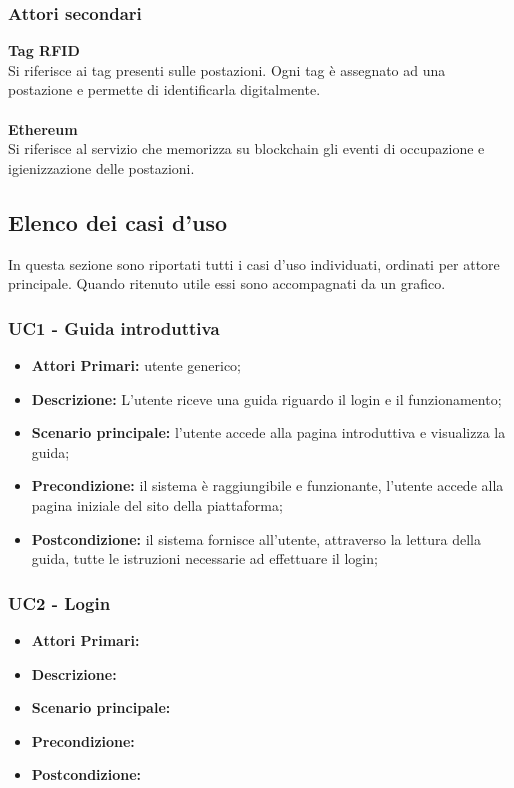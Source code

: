\subsubsection{Attori secondari}
\textbf{Tag RFID}\\
Si riferisce ai tag presenti sulle postazioni. Ogni tag è assegnato ad una postazione e permette di identificarla digitalmente.\\
\\
\textbf{Ethereum}\\
Si riferisce al servizio che memorizza su blockchain gli eventi di occupazione e igienizzazione delle postazioni.\\

\subsection{Elenco dei casi d'uso}
In questa sezione sono riportati tutti i casi d'uso individuati, ordinati per attore principale. Quando ritenuto utile essi sono accompagnati da un grafico.
\\
\subsubsection{ UC1 - Guida introduttiva}
\begin{itemize}
           	\item\textbf{Attori Primari:} utente generico;
           	\item\textbf{Descrizione:} L'utente riceve una guida riguardo il login e il funzionamento;
           	\item\textbf{Scenario principale:} l’utente accede alla pagina introduttiva e visualizza la guida;
           	\item\textbf{Precondizione:} il sistema è raggiungibile e funzionante, l’utente accede alla pagina iniziale del sito della piattaforma;
           	\item\textbf{Postcondizione:} il sistema fornisce all’utente, attraverso la lettura della guida, tutte le istruzioni necessarie ad effettuare il login;
\end{itemize}

\subsubsection{ UC2 - Login}
\begin{itemize}
           	\item\textbf{Attori Primari:} 
           	\item\textbf{Descrizione:} 
           	\item\textbf{Scenario principale:} 
           	\item\textbf{Precondizione:} 
           	\item\textbf{Postcondizione:}
\end{itemize}

